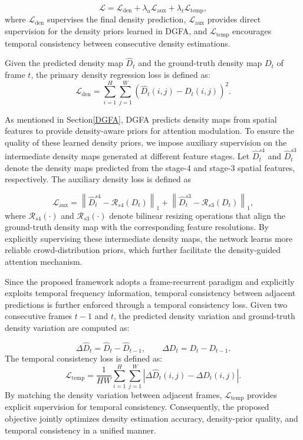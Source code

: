 \documentclass[lettersize,journal]{IEEEtran}
\begin{document}
\begin{equation}
\mathcal{L}
=
\mathcal{L}_{\mathrm{den}}
+
\lambda_a \mathcal{L}_{\mathrm{aux}}
+
\lambda_t \mathcal{L}_{\mathrm{temp}},
\end{equation}
where $\mathcal{L}_{\mathrm{den}}$ supervises the final density prediction, $\mathcal{L}_{\mathrm{aux}}$ provides direct supervision for the density priors learned in DGFA, and $\mathcal{L}_{\mathrm{temp}}$ encourages temporal consistency between consecutive density estimations. 

Given the predicted density map $\hat{D}_t$ and the ground-truth density map $D_t$ of frame $t$, the primary density regression loss is defined as:
\begin{equation}
\mathcal{L}_{\mathrm{den}}
=
\sum_{i=1}^{H}\sum_{j=1}^{W}
\left(
\hat{D}_t(i,j)-D_t(i,j)
\right)^2.
\end{equation}


As mentioned in Section\ref{DGFA}, DGFA predicts density maps from spatial features to provide density-aware priors for attention modulation. To ensure the quality of these learned density priors, we impose auxiliary supervision on the intermediate density maps generated at different feature stages. Let $\hat{D}_t^{s4}$ and $\hat{D}_t^{s3}$ denote the density maps predicted from the stage-4 and stage-3 spatial features, respectively. The auxiliary density loss is defined as

\begin{equation}
\mathcal{L}_{\mathrm{aux}}
=
\left\|
\hat{D}_t^{s4}
-
\mathcal{R}_{s4}(D_t)
\right\|_1
+
\left\|
\hat{D}_t^{s3}
-
\mathcal{R}_{s3}(D_t)
\right\|_1,
\end{equation}
where $\mathcal{R}_{s4}(\cdot)$ and $\mathcal{R}_{s3}(\cdot)$ denote bilinear resizing operations that align the ground-truth density map with the corresponding feature resolutions. By explicitly supervising these intermediate density maps, the network learns more reliable crowd-distribution priors, which further facilitate the density-guided attention mechanism.

Since the proposed framework adopts a frame-recurrent paradigm and explicitly exploits temporal frequency information, temporal consistency between adjacent predictions is further enforced through a temporal consistency loss. Given two consecutive frames $t-1$ and $t$, the predicted density variation and ground-truth density variation are computed as:

\begin{equation}
\Delta\hat{D}_t
=
\hat{D}_t-\hat{D}_{t-1},
\qquad
\Delta D_t
=
D_t-D_{t-1}.
\end{equation}
The temporal consistency loss is defined as:
\begin{equation}
\mathcal{L}_{\mathrm{temp}}
=
\frac{1}{HW}
\sum_{i=1}^{H}
\sum_{j=1}^{W}
\left|
\Delta\hat{D}_t(i,j)
-
\Delta D_t(i,j)
\right|.
\end{equation}
By matching the density variation between adjacent frames, $\mathcal{L}_{\mathrm{temp}}$ provides explicit supervision for temporal consistency. Consequently, the proposed objective jointly optimizes density estimation accuracy, density-prior quality, and temporal consistency in a unified manner.
\end{document}
